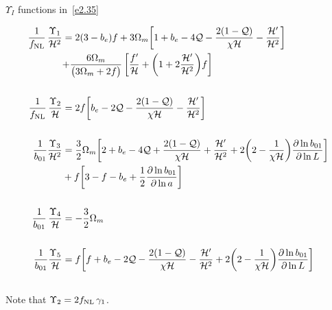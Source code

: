 $\Upsilon_I$ functions in~\eqref{e2.35}

\begin{align}
\frac{1}{\fnl}\,\frac{\Upsilon_{1}}{{\cH^2}} &= 2(3-b_e)f+ 3\Omega_m\bigg[1+b_e-4{\cal Q}-\frac{2(1-\mathcal{Q})}{\chi\cH}-\frac{\cH'}{\cH^{2}}\bigg]
\notag \\ &{} {+ \frac{6\Omega_m}{\big(3\Omega_m+2f\big)}\,\bigg[\frac{f'}{\cH}+\bigg(1+2\frac{\cH'}{\cH^2} \bigg)f \bigg] }
\label{e2.26}
\\ &  \notag  \\
\frac{1}{\fnl}\, \frac{\Upsilon_{2}}{{\cH}} &= %
{2f \bigg[b_{e}-2\Q-\frac{2(1-\Q)}{\chi \cH} - \frac{\cH'}{\cH^{2}}\bigg]} \label{e2.27}
\\ & \notag \\
\frac{1}{b_{01}}\frac{{\Upsilon_{{3}}}}{\cH^{2}} &= \frac{3}{2}\Omega_m\bigg[2+b_e-4\Q+\frac{2(1-\Q)}{\chi \cH} + \frac{\cH'}{\cH^{2}} + 2\bigg(2-\frac{1}{\chi \cH}\bigg)\frac{\partial \ln{b_{01}}}{\partial \ln{{L}}}\bigg] \nonumber \\
& + f\bigg[3-f-b_e + \frac{1}{2}\frac{\partial \ln{b_{01}}}{\partial \ln{a}}\bigg] \label{e2.32} 
\\& \notag  \\
\frac{1}{b_{01}}\,\frac{{\Upsilon_{{4}}}}{\cH} &= -\frac{3}{2}\Omega_{m}   \label{e2.33} 
\\& \notag  \\
\frac{1}{b_{01}}\frac{{\Upsilon_{{5}}}}{\cH} &= f\bigg[f+b_e-2\Q-\frac{2(1-\Q)}{\chi \cH}-\frac{\cH'}{\cH^{2}} + 2\bigg(2-\frac{1}{\chi \cH}\bigg)\frac{\partial \ln{b_{01}}}{\partial \ln{{L}}}\bigg]\label{e2.34}
\\& \notag
\end{align}
Note that $\Upsilon_2= 2 f_\text{NL}\,\gamma_1$.


